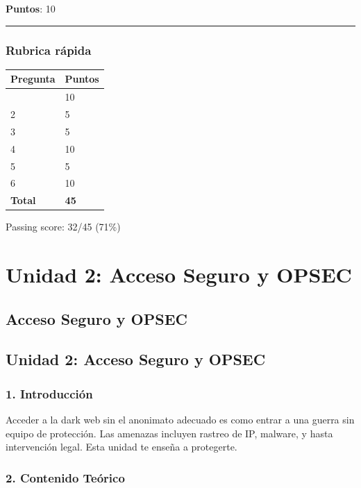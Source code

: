 \documentclass[
  letterpaper,
]{report}
\newcounter{none} %
\begin{document}
\textbf{Puntos}: 10

\begin{center}\rule{0.5\linewidth}{0.5pt}\end{center}

\section{Rubrica rápida}\label{rubrica-ruxe1pida}

{\def\LTcaptype{none} %
\begin{longtable}[]{@{}ll@{}}
\toprule\noalign{}
Pregunta & Puntos \\
\midrule\noalign{}
\endhead
\bottomrule\noalign{}
\endlastfoot
1 & 10 \\
2 & 5 \\
3 & 5 \\
4 & 10 \\
5 & 5 \\
6 & 10 \\
\textbf{Total} & \textbf{45} \\
\end{longtable}
}

Passing score: 32/45 (71\%)

\part{Unidad 2: Acceso Seguro y OPSEC}

\chapter{Acceso Seguro y OPSEC}\label{acceso-seguro-y-opsec}

\chapter{Unidad 2: Acceso Seguro y
OPSEC}\label{unidad-2-acceso-seguro-y-opsec-1}

\section{1. Introducción}\label{introducciuxf3n-1}

Acceder a la dark web sin el anonimato adecuado es como entrar a una
guerra sin equipo de protección. Las amenazas incluyen rastreo de IP,
malware, y hasta intervención legal. Esta unidad te enseña a protegerte.

\section{2. Contenido Teórico}\label{contenido-teuxf3rico-1}
\end{document}
